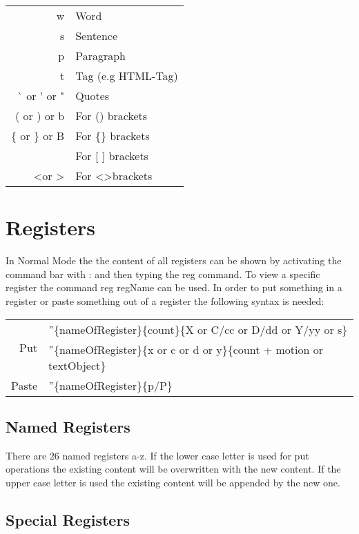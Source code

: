 \documentclass{article}
\begin{document}
\vspace{3mm} 
\begin{tabular}{ r l }
 w & Word \\[0.5ex]
 s & Sentence \\[0.5ex]
 p & Paragraph \\[0.5ex]
 t & Tag (e.g HTML-Tag)\\[0.5ex]
 \`{} or ' or " & Quotes \\[0.5ex]
 ( or ) or b & For () brackets \\[0.5ex]
 \{ or \} or B  & For \{\} brackets \\[0.5ex]
 [ or ]  & For [ ] brackets \\[0.5ex]
 \textless \;or \textgreater  & For \textless \textgreater \;brackets \\[0.5ex]
\end{tabular}

\section{Registers}
In Normal Mode the the content of all registers can be shown by activating the command bar with : and then typing the reg command. To view a specific register the command reg {regName} can be used. In order to put something in a register or paste something out of a register the following syntax is needed: 

\vspace{3mm}
\begin{tabular}{ r l }
\multirow{2}{1.6em}{Put} & $"$\{nameOfRegister\}\{count\}\{X or C/cc or D/dd or Y/yy or s\} \\[0.5ex]
 & $"$\{nameOfRegister\}\{x or c or d or y\}\{count + motion or textObject\} \\[1ex]
 Paste & $"$\{nameOfRegister\}\{p/P\}\\[0.5ex]
\end{tabular}

\subsection{Named Registers}
There are 26 named registers a-z. If the lower case letter is used for put operations the existing content will be overwritten with the new content. If the upper case letter is used the existing content will be appended by the new one.
\subsection{Special Registers}
\end{document}
